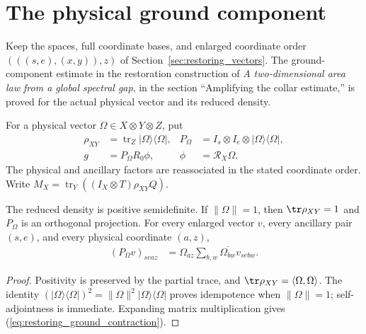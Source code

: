 \section{The physical ground component}
\label{sec:restoring_ground_component}

Keep the spaces, full coordinate bases, and enlarged coordinate order
$(((s,e),(x,y)),z)$ of Section~\ref{sec:restoring_vectors}.
The ground-component estimate in the restoration construction of
\emph{A two-dimensional area law from a global spectral gap}, in the section
``Amplifying the collar estimate,'' is proved for the actual physical vector
and its reduced density.

\begin{definition}
    \label{def:restoring_ground_component}
    \leanok
    For a physical vector $\Omega\in X\otimes Y\otimes Z$, put
    \begin{align}
        \rho_{XY}&=\operatorname{tr}_Z|\Omega\rangle\langle\Omega|,
        &P_\Omega&=I_s\otimes I_e\otimes|\Omega\rangle\langle\Omega|,
        \label{eq:restoring_ground_definition}\\
        g&=P_\Omega R_0\phi,
        &\phi&=\mathcal R_X\Omega.
    \end{align}
    The physical and ancillary factors are reassociated in the stated
    coordinate order. Write
    $M_X=\operatorname{tr}_Y((I_X\otimes T)\rho_{XY}Q)$.
\end{definition}

\begin{theorem}
    \label{thm:restoring_ground_normalization}
    \leanok
    The reduced density is positive semidefinite. If $\|\Omega\|=1$,
    then $\tr\rho_{XY}=1$ and $P_\Omega$ is an orthogonal projection.
    For every enlarged vector $v$, every ancillary pair $(s,e)$, and
    every physical coordinate $(a,z)$,
    \begin{align}
        (P_\Omega v)_{seaz}
          &=\Omega_{az}\sum_{b,w}\overline{\Omega_{bw}}v_{sebw}.
        \label{eq:restoring_ground_contraction}
    \end{align}
\end{theorem}
\begin{proof}\leanok
    Positivity is preserved by the partial trace, and
    $\tr\rho_{XY}=\langle\Omega,\Omega\rangle$.
    The identity
    $(|\Omega\rangle\langle\Omega|)^2
      =\|\Omega\|^2|\Omega\rangle\langle\Omega|$
    proves idempotence when $\|\Omega\|=1$; self-adjointness is immediate.
    Expanding matrix multiplication gives
    (\ref{eq:restoring_ground_contraction}).
\end{proof}

